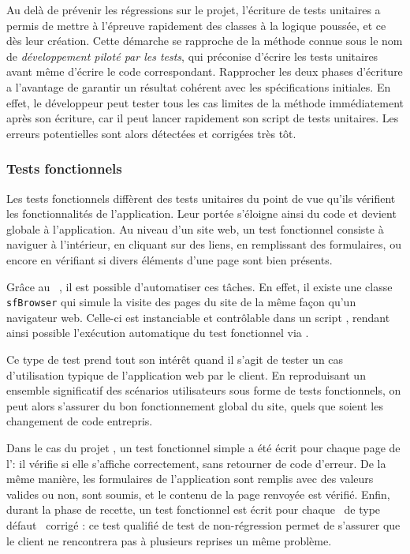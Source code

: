 Au delà de prévenir les régressions sur le projet, l'écriture de tests unitaires a permis de mettre à l'épreuve rapidement des classes à la logique poussée, et ce dès leur création. Cette démarche se rapproche de la méthode connue sous le nom de \emph{développement piloté par les tests}, qui préconise d'écrire les tests unitaires avant même d'écrire le code correspondant. Rapprocher les deux phases d'écriture a l'avantage de garantir un résultat cohérent avec les spécifications initiales. En effet, le développeur peut tester tous les cas limites de la méthode immédiatement après son écriture, car il peut lancer rapidement son script de tests unitaires. Les erreurs potentielles sont alors détectées et corrigées très tôt.


\subsubsection{Tests fonctionnels}

Les tests fonctionnels diffèrent des tests unitaires du point de vue qu'ils vérifient les fonctionnalités de l'application. Leur portée s'éloigne ainsi du code et devient globale à l'application. Au niveau d'un site web, un test fonctionnel consiste à naviguer à l'intérieur, en cliquant sur des liens, en remplissant des formulaires, ou encore en vérifiant si divers éléments d'une page sont bien présents.

Grâce au \afm\ \asf, il est possible d'automatiser ces tâches. En effet, il existe une classe \texttt{sfBrowser} qui simule la visite des pages du site de la même façon qu'un navigateur web. Celle-ci est instanciable et contrôlable dans un script \aphp, rendant ainsi possible l'exécution automatique du test fonctionnel via \asismo.

Ce type de test prend tout son intérêt quand il s'agit de tester un cas d'utilisation typique de l'application web par le client. En reproduisant un ensemble significatif des scénarios utilisateurs sous forme de tests fonctionnels, on peut alors s'assurer du bon fonctionnement global du site, quels que soient les changement de code entrepris.

Dans le cas du projet \aey, un test fonctionnel simple a été écrit pour chaque page de l'\aintranet : il vérifie si elle s'affiche correctement, sans retourner de code d'erreur. De la même manière, les formulaires de l'application sont remplis avec des valeurs valides ou non, sont soumis, et le contenu de la page renvoyée est vérifié. Enfin, durant la phase de recette, un test fonctionnel est écrit pour chaque \abug\ de type \og défaut \fg\ corrigé : ce test qualifié de test de non-régression permet de s'assurer que le client ne rencontrera pas à plusieurs reprises un même problème. 
